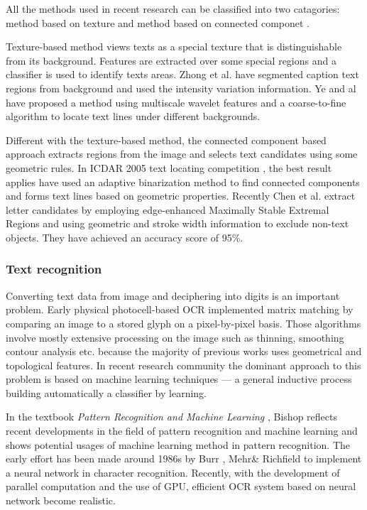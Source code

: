 \documentclass[paper=a4, french, 11pt]{scrartcl}
\begin{document}
All the methods used in recent research can be classified into two catagories: method based on texture \cite{ye2003robust} \cite{kim2003texture} and method based on connected componet \cite{yin2014robust} \cite{ezaki2004text}.

Texture-based method views texts as a special texture that is distinguishable from its background. Features are extracted over some special regions and a classifier is used to identify texts areas. Zhong et al. \cite{zhong2000automatic} have segmented caption text regions from background and used the intensity variation information. Ye and al \cite{ye2003robust} have proposed a method using multiscale wavelet features and a coarse-to-fine algorithm to locate text lines under different backgrounds.

Different with the texture-based method, the connected component based approach extracts regions from the image and selects text candidates using some geometric rules. In ICDAR 2005 text locating competition \cite{lucas2005icdar}, the best result applies have used an adaptive binarization method to find connected components and forms text lines based on geometric properties. Recently Chen et al. \cite{chen2011robust} extract letter candidates by employing edge-enhanced Maximally Stable Extremal Regions and using geometric and stroke width information to exclude non-text objects. They have achieved an accuracy score of 95\%.

\subsubsection{Text recognition}
Converting text data from image and deciphering into digits is an important problem. Early physical photocell-based OCR implemented matrix matching by comparing an image to a stored glyph on a pixel-by-pixel basis. Those algorithms involve mostly extensive processing on the image such as thinning, smoothing contour analysis etc. because the majority of previous works uses geometrical and topological features. In recent research community the dominant approach to this problem is based on machine learning techniques --- a general inductive process building automatically a classifier by learning.

In the textbook \textit{Pattern Recognition and Machine Learning} \cite{anzai2012pattern}, Bishop reflects recent developments in the field of pattern recognition and machine learning and shows potential usages of machine learning method in pattern recognition. The early effort has been made around 1986s by Burr \cite{burr1988experiments}, Mehr\& Richfield \cite{rajavelu1989neural} to implement a neural network in character recognition. Recently, with the development of parallel computation and the use of GPU, efficient OCR system based on neural network become realistic. 
\end{document}
